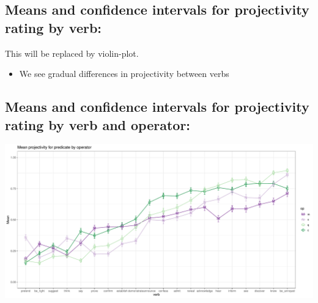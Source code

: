 \documentclass[10pt]{article}\usepackage[]{graphicx}\usepackage[]{color}
\newenvironment{knitrout}{}{} %
\begin{document}
\subsection{Means and confidence intervals for projectivity rating by verb:}
This will be replaced by violin-plot.
% 
% 
\begin{itemize}
  \item We see gradual differences in projectivity between verbs
\end{itemize}

\subsection{Means and confidence intervals for projectivity rating by verb and operator:}
\begin{knitrout}
\color{fgcolor}

{\centering \includegraphics[width=\linewidth]{figures/figuressummary-combined-1} 

}


\end{knitrout}
\end{document}
